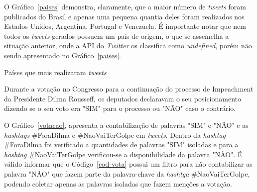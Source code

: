 O Gráfico~\ref{paises} demonstra, claramente, que a maior número de \textit{tweets} foram publicados do Brasil e apenas uma pequena quantia deles foram realizados nos Estados Unidos, Argentina, Portugal e Venezuela. É importante notar que nem todos os \textit{tweets} gerados possuem um país de origem, o que se assemelha a situação anterior, onde a API do \textit{Twitter} os classifica como \textit{undefined}, porém não sendo apresentado no Gráfico~\ref{paises}.

\begin{grafico}[h]
	\centering
	\caption{Países que mais realizaram \textit{tweets}}
	\vspace{-0.3cm}
	\label{paises}
\end{grafico}

Durante a votação no Congresso para a continuação do processo de Impeachment da Presidente Dilma Rousseff, os deputados declaravam o seu posicionamento dizendo se o seu voto era "SIM" para o processo ou "NÃO" caso o contrário.

O Gráfico~\ref{votacao}, apresenta a contabilização de palavras "SIM" \space e "NÃO" \space e as \textit{hashtags} \#ForaDilma e \#NaoVaiTerGolpe em \textit{tweets}. Dentro da \textit{hashtag} \#ForaDilma foi verificado a quantidades de palavras "SIM" isoladas e para a \textit{hashtag} \#NaoVaiTerGolpe verificou-se a disponibilidade da palavra "NÃO". É válido informar que o Código~\ref{cod-vota} possui um filtro para não contabilizar as palavra "NÃO" que fazem parte da palavra-chave da \textit{hashtga} \#NaoVaiTerGolpe, podendo coletar apenas as palavras isoladas que fazem menções a votação. \\ \\ \\ \\ \\

